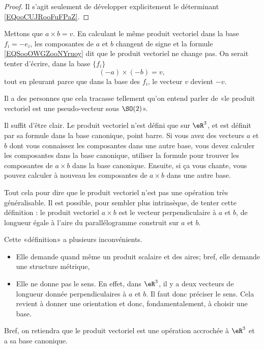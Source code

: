 \begin{proof}
    Il s'agit seulement de développer explicitement le déterminant \eqref{EQooCUJRooFuFPaZ}.
\end{proof}

\begin{normaltext}
    Mettons que \( a\times b=v\). En calculant le même produit vectoriel dans la base \( f_i=-e_i\), les composantes de \( a\) et \( b\) changent de signe et la formule \eqref{EQSooOWGZooNYruoy} dit que le produit vectoriel ne change pas. On serait tenter d'écrire, dans la base \( \{ f_i \}\)
    \begin{equation}
        (-a)\times (-b)=v,
    \end{equation}
    tout en pleurant parce que dans la base des \( f_i\), le vecteur \( v\) devient \( -v\).

    Il a des personnes que cela tracasse tellement qu'on entend parler de «le produit vectoriel est une pseudo-vecteur sous \( \SO(2)\)».

    Il suffit d'être clair. Le produit vectoriel n'est défini que sur \( \eR^3\), et est définit par sa formule dans la base canonique, point barre. Si vous avez des vecteurs \( a\) et \( b\) dont vous connaissez les composantes dans une autre base, vous devez calculer les composantes dans la base canonique, utiliser la formule pour trouver les composantes de \( a\times b\) dans la base canonique. Ensuite, si ça vous chante, vous pouvez calculer à nouveau les composantes de \( a\times b\) dans une autre base.

    Tout cela pour dire que le produit vectoriel n'est pas une opération très généralisable. Il est possible, pour sembler plus intrinsèque, de tenter cette définition : le produit vectoriel \( a\times b\) est le vecteur perpendiculaire à \( a\) et \( b\), de longueur égale à l'aire du parallélogramme construit sur \( a\) et \( b\).

    Cette «définition» a plusieurs inconvénients.
    \begin{itemize}
        \item Elle demande quand même un produit scalaire et des aires; bref, elle demande une structure métrique,
        \item Elle ne donne pas le sens. En effet, dans \( \eR^3\), il y a deux vecteurs de longueur donnée perpendiculaires à \( a\) et \( b\). Il faut donc préciser le sens. Cela revient à donner une orientation et donc, fondamentalement, à choisir une base.
    \end{itemize}
    
    Bref, on retiendra que le produit vectoriel est une opération accrochée à \( \eR^3\) et a sa base canonique.
\end{normaltext}

